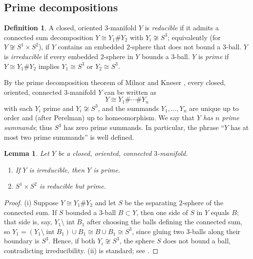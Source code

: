 \documentclass[11pt]{article}
\newtheorem{lemma}[theorem]{Lemma}
\theoremstyle{definition}
\newtheorem{definition}[theorem]{Definition}
\theoremstyle{remark}
\numberwithin{equation}{section}
\begin{document}
\subsection{Prime decompositions}

\begin{definition}\label{def:prime}
A closed, oriented $3$-manifold $Y$ is \emph{reducible} if it admits a
connected sum decomposition $Y\cong Y_{1}\#Y_{2}$ with
$Y_{i}\not\cong S^{3}$; equivalently (for $Y\not\cong S^{1}\times S^{2}$),
if $Y$ contains an embedded $2$-sphere that does not bound a $3$-ball.
$Y$ is \emph{irreducible} if every embedded $2$-sphere in $Y$ bounds a
$3$-ball.  $Y$ is \emph{prime} if $Y\cong Y_{1}\#Y_{2}$ implies
$Y_{1}\cong S^{3}$ or $Y_{2}\cong S^{3}$.
\end{definition}

By the prime decomposition theorem of Milnor and Kneser
\cite{Mi62,He76}, every closed, oriented, connected $3$-manifold $Y$ can
be written as
\[
Y\cong Y_{1}\#\cdots\# Y_{n}
\]
with each $Y_{i}$ prime and $Y_{i}\not\cong S^{3}$, and the summands
$Y_{1},\dots,Y_{n}$ are unique up to order and (after Perelman) up to
homeomorphism.  We say that \emph{$Y$ has $n$ prime summands}; thus
$S^{3}$ has zero prime summands.  In particular, the phrase ``$Y$ has at
most two prime summands'' is well defined.

\begin{lemma}\label{lem:irr-prime}
Let $Y$ be a closed, oriented, connected $3$-manifold.
\begin{enumerate}
\item[(i)] If $Y$ is irreducible, then $Y$ is prime.
\item[(ii)] $S^{1}\times S^{2}$ is reducible but prime.
\end{enumerate}
\end{lemma}

\begin{proof}
(i) Suppose $Y\cong Y_{1}\#Y_{2}$ and let $S$ be the separating
$2$-sphere of the connected sum.  If $S$ bounded a $3$-ball $B\subset Y$,
then one side of $S$ in $Y$ equals $B$; that side is, say,
$Y_{1}\setminus\operatorname{int}B_{1}$ after choosing the balls defining
the connected sum, so
$Y_{1}=(Y_{1}\setminus\operatorname{int}B_{1})\cup B_{1}\cong B\cup
B_{1}\cong S^{3}$, since gluing two $3$-balls along their boundary is
$S^{3}$.  Hence, if both $Y_{i}\not\cong S^{3}$, the sphere $S$ does not
bound a ball, contradicting irreducibility.
(ii) is standard; see \cite{He76}.
\end{proof}
\end{document}
